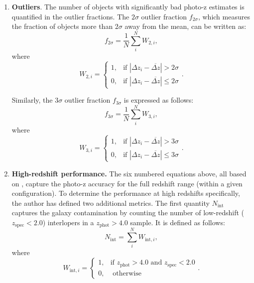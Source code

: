 \begin{enumerate}[label=(\roman*)]
\item \textbf{Outliers}. The number of objects with significantly bad photo-z estimates is quantified in the outlier fractions. The $2\sigma$ outlier fraction $f_{2\sigma}$, which measures the fraction of objects more than $2\sigma$ away from the mean, can be written as: 
  \begin{equation}
  f_{2\sigma} = \frac{1}{N}\sum^{N}_{i}{W_{2,i}},
  \end{equation}
where
  \[
  W_{2,i} =
  \begin{cases}
  1, & \text{if } \left| \Delta z_{i} - \overbar{\Delta z} \right| > 2 \sigma \\
  0, & \text{if } \left| \Delta z_{i} - \overbar{\Delta z} \right| \leq 2 \sigma 
  \end{cases}.
  \]

Similarly, the $3\sigma$ outlier fraction $f_{3\sigma}$ is expressed as follows:
  \begin{equation}
  f_{3\sigma} = \frac{1}{N}\sum^{N}_{i}{W_{3,i}}, \label{eqn:frac3}
  \end{equation}
where
  \[
  W_{3,i} =
  \begin{cases}
  1, & \text{if } \left| \Delta z_{i} - \overbar{\Delta z} \right| > 3 \sigma \\
  0, & \text{if } \left| \Delta z_{i} - \overbar{\Delta z} \right| \leq 3 \sigma 
  \end{cases}.
  \]
  
  \item \textbf{High-redshift performance.} The six numbered equations above, all based on \cite{2014MNRAS.445.1482S}, capture the photo-z accuracy for the full redshift range (within a given configuration). To determine the performance at high redshifts specifically, the author has defined two additional metrics. The first quantity $N_{\mathrm{int}}$ captures the galaxy contamination by counting the number of low-redshift ($z_{\mathrm{spec}}<2.0$) interlopers in a $z_{\mathrm{phot}}>4.0$ sample. It is defined as follows: 
  \begin{equation}
      N_{\mathrm{int}} = \sum^{N}_{i}{W_{\mathrm{int},i}},\label{eqn:N_int}
  \end{equation}
  where
    \[
  W_{\mathrm{int},i} =
  \begin{cases}
  1, & \text{if } z_{\mathrm{phot}}>4.0 \text{ and } z_{\mathrm{spec}}<2.0 \\
  0, & \text{ otherwise} 
  \end{cases}.
  \]
  

\end{enumerate}
